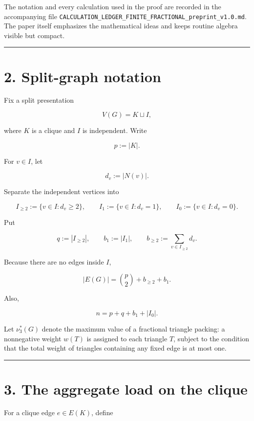 \documentclass[
  11pt,
]{article}
\begin{document}
The notation and every calculation used in the proof are recorded in the
accompanying file
\texttt{CALCULATION\_LEDGER\_FINITE\_FRACTIONAL\_preprint\_v1.0.md}. The
paper itself emphasizes the mathematical ideas and keeps routine algebra
visible but compact.

\begin{center}\rule{0.5\linewidth}{0.5pt}\end{center}

\section{2. Split-graph notation}\label{split-graph-notation}

Fix a split presentation

\[
V(G)=K\sqcup I,
\]

where \(K\) is a clique and \(I\) is independent. Write

\[
p:=|K|.
\]

For \(v\in I\), let

\[
d_v:=|N(v)|.
\]

Separate the independent vertices into

\[
I_{\ge2}:=\{v\in I:d_v\ge2\},
\qquad
I_1:=\{v\in I:d_v=1\},
\qquad
I_0:=\{v\in I:d_v=0\}.
\]

Put

\[
q:=|I_{\ge2}|,
\qquad
b_1:=|I_1|,
\qquad
b_{\ge2}:=\sum_{v\in I_{\ge2}}d_v.
\]

Because there are no edges inside \(I\),

\[
|E(G)|
=
\binom{p}{2}+b_{\ge2}+b_1.
\tag{2.1}
\]

Also,

\[
n=p+q+b_1+|I_0|.
\tag{2.2}
\]

Let \(\nu_3^*(G)\) denote the maximum value of a fractional triangle
packing: a nonnegative weight \(w(T)\) is assigned to each triangle
\(T\), subject to the condition that the total weight of triangles
containing any fixed edge is at most one.

\begin{center}\rule{0.5\linewidth}{0.5pt}\end{center}

\section{3. The aggregate load on the
clique}\label{the-aggregate-load-on-the-clique}

For a clique edge \(e\in E(K)\), define
\end{document}
